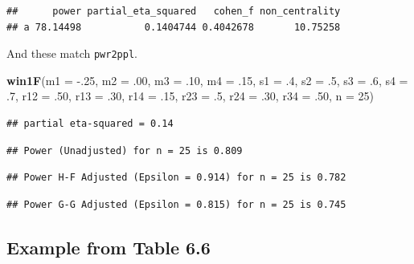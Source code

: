 \documentclass[]{book}
\newenvironment{Shaded}{\begin{snugshade}}{\end{snugshade}}
\newcommand{\DataTypeTok}[1]{\textcolor[rgb]{0.13,0.29,0.53}{#1}}
\newcommand{\DecValTok}[1]{\textcolor[rgb]{0.00,0.00,0.81}{#1}}
\newcommand{\FloatTok}[1]{\textcolor[rgb]{0.00,0.00,0.81}{#1}}
\newcommand{\KeywordTok}[1]{\textcolor[rgb]{0.13,0.29,0.53}{\textbf{#1}}}
\newcommand{\NormalTok}[1]{#1}
\begin{document}
\begin{verbatim}
##      power partial_eta_squared   cohen_f non_centrality
## a 78.14498           0.1404744 0.4042678       10.75258
\end{verbatim}

And these match \texttt{pwr2ppl}.

\begin{Shaded}
\begin{Highlighting}[]
\KeywordTok{win1F}\NormalTok{(}\DataTypeTok{m1 =} \FloatTok{-.25}\NormalTok{, }\DataTypeTok{m2 =} \FloatTok{.00}\NormalTok{, }\DataTypeTok{m3 =} \FloatTok{.10}\NormalTok{, }\DataTypeTok{m4 =} \FloatTok{.15}\NormalTok{,}
      \DataTypeTok{s1 =} \FloatTok{.4}\NormalTok{, }\DataTypeTok{s2 =} \FloatTok{.5}\NormalTok{, }\DataTypeTok{s3 =} \FloatTok{.6}\NormalTok{, }\DataTypeTok{s4 =} \FloatTok{.7}\NormalTok{,}
      \DataTypeTok{r12 =} \FloatTok{.50}\NormalTok{, }\DataTypeTok{r13 =} \FloatTok{.30}\NormalTok{,}
      \DataTypeTok{r14 =} \FloatTok{.15}\NormalTok{, }\DataTypeTok{r23 =} \FloatTok{.5}\NormalTok{,}
      \DataTypeTok{r24 =} \FloatTok{.30}\NormalTok{, }\DataTypeTok{r34 =} \FloatTok{.50}\NormalTok{,}
      \DataTypeTok{n =} \DecValTok{25}\NormalTok{)}
\end{Highlighting}
\end{Shaded}

\begin{verbatim}
## partial eta-squared = 0.14
\end{verbatim}

\begin{verbatim}
## Power (Unadjusted) for n = 25 is 0.809
\end{verbatim}

\begin{verbatim}
## Power H-F Adjusted (Epsilon = 0.914) for n = 25 is 0.782
\end{verbatim}

\begin{verbatim}
## Power G-G Adjusted (Epsilon = 0.815) for n = 25 is 0.745
\end{verbatim}

\hypertarget{example-from-table-6.6}{%
\subsection{Example from Table 6.6}\label{example-from-table-6.6}}
\end{document}
